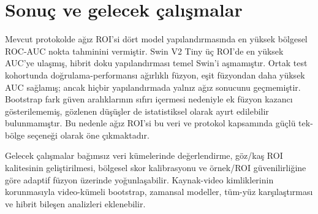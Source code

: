 \documentclass[a4paper]{elektr}
\begin{document}
\section{Sonuç ve gelecek çalışmalar}
Mevcut protokolde ağız ROI'si dört model yapılandırmasında en yüksek bölgesel ROC-AUC nokta tahminini vermiştir. Swin V2 Tiny üç ROI'de en yüksek AUC'ye ulaşmış, hibrit doku yapılandırması temel Swin'i aşmamıştır. Ortak test kohortunda doğrulama-performansı ağırlıklı füzyon, eşit füzyondan daha yüksek AUC sağlamış; ancak hiçbir yapılandırmada yalnız ağız sonucunu geçmemiştir. Bootstrap fark güven aralıklarının sıfırı içermesi nedeniyle ek füzyon kazancı gösterilememiş, gözlenen düşüşler de istatistiksel olarak ayırt edilebilir bulunmamıştır. Bu nedenle ağız ROI'si bu veri ve protokol kapsamında güçlü tek-bölge seçeneği olarak öne çıkmaktadır.

Gelecek çalışmalar bağımsız veri kümelerinde değerlendirme, göz/kaş ROI kalitesinin geliştirilmesi, bölgesel skor kalibrasyonu ve örnek/ROI güvenilirliğine göre adaptif füzyon üzerinde yoğunlaşabilir. Kaynak-video kimliklerinin korunmasıyla video-kümeli bootstrap, zamansal modeller, tüm-yüz karşılaştırması ve hibrit bileşen analizleri eklenebilir. 
\end{document}
